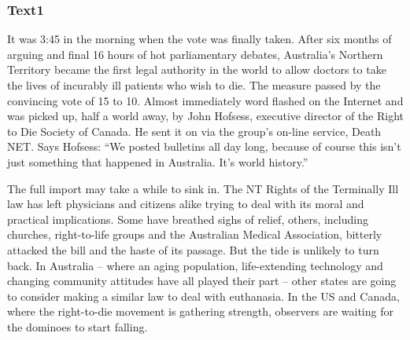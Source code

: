 \documentclass[a4paper]{article}
\begin{document}
\subsubsection{Text1}

\par
It was 3:45 in the morning when the vote was finally taken. After six months of arguing and final 16 hours of hot parliamentary debates, Australia’s Northern Territory became the first legal authority in the world to allow doctors to take the lives of incurably ill patients who wish to die. The measure passed by the convincing vote of 15 to 10. Almost immediately word flashed on the Internet and was picked up, half a world away, by John Hofsess, executive director of the Right to Die Society of Canada. He sent it on via the group’s on-line service, Death NET. Says Hofsess: “We posted bulletins all day long, because of course this isn’t just something that happened in Australia. It’s world history.”

\par
The full import may take a while to sink in. The NT Rights of the Terminally Ill law has left physicians and citizens alike trying to deal with its moral and practical implications. Some have breathed sighs of relief, others, including churches, right-to-life groups and the Australian Medical Association, bitterly attacked the bill and the haste of its passage. But the tide is unlikely to turn back. In Australia -- where an aging population, life-extending technology and changing community attitudes have all played their part -- other states are going to consider making a similar law to deal with euthanasia. In the US and Canada, where the right-to-die movement is gathering strength, observers are waiting for the dominoes to start falling.
\end{document}
